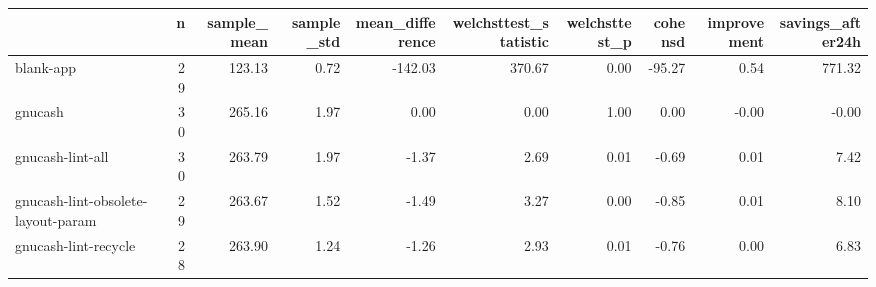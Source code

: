 \begin{tabular}{lrrrrrrrrr}
\toprule
{} &   n &  sample\_mean &  sample\_std &  mean\_difference &  welchsttest\_statistic &  welchsttest\_p &  cohensd &  improvement &  savings\_after24h \\
\midrule
blank-app                          &  29 &       123.13 &        0.72 &          -142.03 &                 370.67 &           0.00 &   -95.27 &         0.54 &            771.32 \\
gnucash                            &  30 &       265.16 &        1.97 &             0.00 &                   0.00 &           1.00 &     0.00 &        -0.00 &             -0.00 \\
gnucash-lint-all                   &  30 &       263.79 &        1.97 &            -1.37 &                   2.69 &           0.01 &    -0.69 &         0.01 &              7.42 \\
gnucash-lint-obsolete-layout-param &  29 &       263.67 &        1.52 &            -1.49 &                   3.27 &           0.00 &    -0.85 &         0.01 &              8.10 \\
gnucash-lint-recycle               &  28 &       263.90 &        1.24 &            -1.26 &                   2.93 &           0.01 &    -0.76 &         0.00 &              6.83 \\
\bottomrule
\end{tabular}

